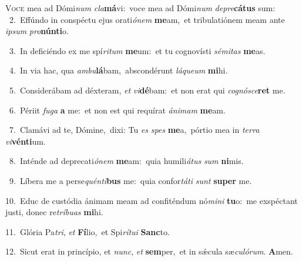 \lettrine{\initial\textcolor{\initialcolor}{V}}{oce} mea ad Dómi\textit{num} \textit{cla}\-\textbf{má}vi:~\star voce mea ad Dómi\textit{num} \textit{de}\-\textit{pre}\textbf{cá}\textbf{tus} sum:\\
{\numbfont\textcolor{\numbcolor}{~2.}}~Effúndo in conspéctu ejus orati\-\textit{ó}\-\textit{nem} \textbf{me}\-am,~\star et tribulatiónem meam ante \textit{ip}\-\textit{sum} \textit{pro}\-\textbf{nún}\textbf{ti}o.\par
{\numbfont\textcolor{\numbcolor}{~3.}}~In deficiéndo ex me spí\-\textit{ri}\-\textit{tum} \textbf{me}\-um:~\star et tu cognovísti \textit{sé}\-\textit{mi}\textit{tas} \textbf{me}\-as.\par
{\numbfont\textcolor{\numbcolor}{~4.}}~In via hac, qua \textit{am}\-\textit{bu}\textbf{lá}bam,~\star abscondérunt \textit{lá}\-\textit{que}\textit{um} \textbf{mi}\-hi.\par
{\numbfont\textcolor{\numbcolor}{~5.}}~Considerábam ad déxteram, \textit{et} \textit{vi}\-\textbf{dé}bam:~\star et non erat qui \textit{co}\-\textit{gnó}\textit{sce}\textbf{ret} me.\par
{\numbfont\textcolor{\numbcolor}{~6.}}~Périit \textit{fu}\-\textit{ga} \textbf{a} me:~\star et non est qui requírat \textit{á}\-\textit{ni}\textit{mam} \textbf{me}\-am.\par
{\numbfont\textcolor{\numbcolor}{~7.}}~Clamávi ad te, Dómine,~\dagger dixi: Tu \textit{es} \textit{spes} \textbf{me}\-a,~\star pórtio mea in \textit{ter}\-\textit{ra} \textit{vi}\-\textbf{vén}\textbf{ti}um.\par
{\numbfont\textcolor{\numbcolor}{~8.}}~Inténde ad deprecati\-\textit{ó}\-\textit{nem} \textbf{me}\-am:~\star quia humili\-\textit{á}\-\textit{tus} \textit{sum} \textbf{ni}\-mis.\par
{\numbfont\textcolor{\numbcolor}{~9.}}~Líbera me a perse\-\textit{quén}\-\textit{ti}\textbf{bus} me:~\star quia confor\-\textit{tá}\-\textit{ti} \textit{sunt} \textbf{su}\-\textbf{per} me.\par
{\numbfont\textcolor{\numbcolor}{10.}}~Educ de custódia ánimam meam ad confiténdum nó\-\textit{mi}\-\textit{ni} \textbf{tu}\-o:~\star me exspéctant justi, donec re\-\textit{trí}\-\textit{bu}\textit{as} \textbf{mi}\-hi.\par
{\numbfont\textcolor{\numbcolor}{11.}}~Glória Pa\-\textit{tri}\-, \textit{et} \textbf{Fí}\-lio,~\star et Spi\-\textit{rí}\-\textit{tu}\textit{i} \textbf{Sanc}\-to.\par
{\numbfont\textcolor{\numbcolor}{12.}}~Sicut erat in princípio, et \textit{nunc}\-, \textit{et} \textbf{sem}\-per,~\star et in sǽcula sæ\-\textit{cu}\-\textit{ló}\textit{rum}. \textbf{A}\-men.\par
